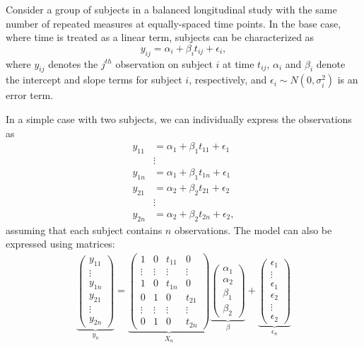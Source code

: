 Consider a group of subjects in a balanced longitudinal study with the same number of repeated measures at  equally-spaced time points.  In the base case, where time is treated as a linear term, subjects can be characterized as
\[
y_{ij} = \alpha_{i} + \beta_{i}t_{ij} + \epsilon_{i}, 
\]
where $y_{ij}$ denotes the $j^{th}$ observation on subject $i$ at time $t_{ij}$, $\alpha_{i}$ and $\beta_{i}$ denote the intercept and slope terms for subject $i$, respectively, and $\epsilon_i \sim N(0, \sigma^2_i)$ is an error term. 

In a simple case with two subjects, we can individually  express the observations as
\begin{align*}
y_{11} &= \alpha_{1} + \beta_{1}t_{11} + \epsilon_{1}\\
&\vdots\\
y_{1n} &= \alpha_{1} + \beta_{1}t_{1n} + \epsilon_{1}\\
y_{21} &= \alpha_{2} + \beta_{2}t_{21} + \epsilon_{2}\\
&\vdots\\
y_{2n} &= \alpha_{2} + \beta_{2}t_{2n} + \epsilon_{2},
\end{align*}
assuming that each subject contains $n$ observations. The model can also be expressed using matrices:
\begin{gather}
\label{eq:long_model}
 \underbrace{\begin{pmatrix} y_{11} \\ \vdots \\ y_{1n} \\ y_{21} \\ \vdots\\ y_{2n} \end{pmatrix}}_{y_n} =
   \underbrace{
   \begin{pmatrix}
   1 & 0 & t_{11} & 0\\
   \vdots & \vdots & \vdots & \vdots \\
   1 & 0 & t_{1n} & 0\\
   0 & 1 & 0 & t_{21}\\
   \vdots & \vdots & \vdots & \vdots \\
   0 & 1 & 0 & t_{2n}
   \end{pmatrix}
   }_{X_n}
   \underbrace{
      \begin{pmatrix}
         \alpha_{1}\\
         \alpha_{2}\\
         \beta_{1}\\
         \beta_{2}
      \end{pmatrix}
   }_{\beta}
   + 
   \underbrace{
   \begin{pmatrix}
   \epsilon_{1}\\
   \vdots\\
   \epsilon_{1}\\
   \epsilon_{2}\\
   \vdots\\
   \epsilon_{2}
   \end{pmatrix}
   }_{\epsilon_n}
\end{gather}

